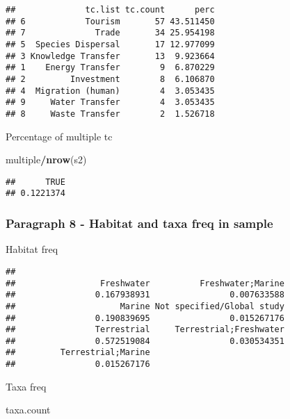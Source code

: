 \documentclass[
]{article}
\newenvironment{Shaded}{\begin{snugshade}}{\end{snugshade}}
\newcommand{\KeywordTok}[1]{\textcolor[rgb]{0.13,0.29,0.53}{\textbf{#1}}}
\newcommand{\NormalTok}[1]{#1}
\newcommand{\OperatorTok}[1]{\textcolor[rgb]{0.81,0.36,0.00}{\textbf{#1}}}
\begin{document}
\begin{verbatim}
##              tc.list tc.count      perc
## 6            Tourism       57 43.511450
## 7              Trade       34 25.954198
## 5  Species Dispersal       17 12.977099
## 3 Knowledge Transfer       13  9.923664
## 1    Energy Transfer        9  6.870229
## 2         Investment        8  6.106870
## 4  Migration (human)        4  3.053435
## 9     Water Transfer        4  3.053435
## 8     Waste Transfer        2  1.526718
\end{verbatim}

Percentage of multiple tc

\begin{Shaded}
\begin{Highlighting}[]
\NormalTok{multiple}\OperatorTok{/}\KeywordTok{nrow}\NormalTok{(s2)}
\end{Highlighting}
\end{Shaded}

\begin{verbatim}
##      TRUE 
## 0.1221374
\end{verbatim}

\hypertarget{paragraph-8---habitat-and-taxa-freq-in-sample}{%
\subsubsection{Paragraph 8 - Habitat and taxa freq in
sample}\label{paragraph-8---habitat-and-taxa-freq-in-sample}}

Habitat freq

\begin{Shaded}
\end{Shaded}

\begin{verbatim}
## 
##                 Freshwater          Freshwater;Marine 
##                0.167938931                0.007633588 
##                     Marine Not specified/Global study 
##                0.190839695                0.015267176 
##                Terrestrial     Terrestrial;Freshwater 
##                0.572519084                0.030534351 
##         Terrestrial;Marine 
##                0.015267176
\end{verbatim}

Taxa freq

\begin{Shaded}
\begin{Highlighting}[]
\NormalTok{taxa.count}
\end{Highlighting}
\end{Shaded}
\end{document}
